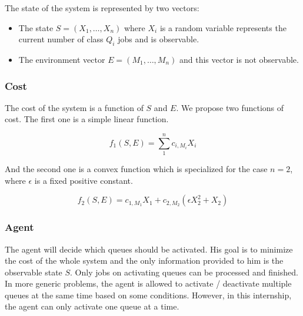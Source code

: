 \documentclass[
  a4paper, xcolor = usenames,dvipsnames]{article}
\providecommand{\tightlist}{%
  \setlength{\itemsep}{0pt}\setlength{\parskip}{0pt}}
\begin{document}
The state of the system is represented by two vectors:

\begin{itemize}
\tightlist
\item
  The state \(S = (X_{1}, \dots, X_{n})\) where \(X_{i}\) is a random variable represents the current number of class \(Q_{i}\) jobs and is observable.
\item
  The environment vector \(E = (M_{1}, \dots, M_{n})\) and this vector is not observable.
\end{itemize}

\hypertarget{cost}{%
\subsubsection{Cost}\label{cost}}

The cost of the system is a function of \(S\) and \(E\). We propose two functions of cost. The first one is a simple linear function.

\[
f_{1}(S, E) = \sum_{1}^{n} c_{i, M_{i}} X_{i}
\]

And the second one is a convex function which is specialized for the case \(n = 2\), where \(\epsilon\) is a fixed positive constant.

\[
f_{2}(S, E) = c_{1, M_{1}} X_{1} + c_{2, M_{2}} (\epsilon X_{2}^{2} + X_{2})
\]

\hypertarget{agent}{%
\subsubsection{Agent}\label{agent}}

The agent will decide which queues should be activated. His goal is to minimize the cost of the whole system and the only information provided to him is the observable state \(S\). Only jobs on activating queues can be processed and finished. In more generic problems, the agent is allowed to activate / deactivate multiple queues at the same time based on some conditions. However, in this internship, the agent can only activate one queue at a time.
\end{document}
